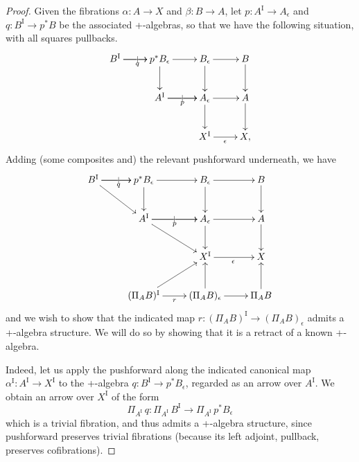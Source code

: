 \documentclass[11pt]{article}
\makeatletter
\newcommand{\pbcorner}[1][dr]{\save*!/#1-1.2pc/#1:(-1,1)@^{|-}\restore}
\newcommand{\ra}{\ensuremath{\rightarrow}}
\newcommand{\I}{\ensuremath{\mathrm{I}}}
\theoremstyle{remark}
\theoremstyle{definition}
\makeatother
\begin{document}
\begin{proof}
Given the fibrations $\alpha : A \ra X$ and $\beta: B\ra A$, let $p : A^\I \ra A_\epsilon$ and $q : B^\I \ra p^*B$ be the associated +-algebras, so that we have the following situation, with all squares pullbacks.
\begin{equation}\label{diagram:frobenius1}
\xymatrix{
B^\I \ar[r]|| \ar[r]_{q}   & p^*B_\epsilon \ar[r]  \ar[d]  & B_{\epsilon}  \ar[d]   \ar[r] & B \ar[d]\\
&A^\I \ar[r]|| \ar[r]_{p}  & A_{\epsilon} \ar[d]   \ar[r] & A \ar[d]\\
&& X^\I \ar[r]_{\epsilon} &  X,
}
\end{equation}
Adding (some composites and) the relevant pushforward underneath, we have
 \begin{equation}\label{diagram:frobenius2}
\xymatrix{
B^\I \ar[r]|| \ar[r]_{q} \ar[rd]  & p^*B_\epsilon \ar[r]  \ar[d]  & B_{\epsilon}  \ar[d]   \ar[r] & B \ar[d] \\
& A^\I \ar[r]|| \ar[r]_{p} \ar[rd]  & A_{\epsilon} \ar[d]   \ar[r] & A \ar[d] \\
&& X^\I \ar[r]_{\epsilon} &  X \\
& (\Pi_AB)^\I  \ar[r]_r  \ar[ru] & (\Pi_AB)_\epsilon  \ar[u] \ar[r] & \Pi_AB \ar[u]
}
\end{equation}
and we wish to show that the indicated map $r : (\Pi_AB)^\I \to (\Pi_AB)_\epsilon$
 admits a +-algebra structure. We will do so by showing that it is a retract of a known +-algebra.

Indeed, let us apply the pushforward along the indicated canonical map $\alpha^\I:A^\I \ra X^\I$ to the +-algebra $q : B^\I \ra p^*B_\epsilon$, regarded as an arrow over $A^\I$.  We obtain an arrow over $X^\I$ of the form
\[
\Pi_{A^\I}\,q :  \Pi_{A^\I}\,B^\I \to \Pi_{A^\I}\,p^*B_\epsilon
\]
which is a trivial fibration, and thus admits a +-algebra structure, since pushforward preserves trivial fibrations (because its left adjoint, pullback, preserves cofibrations).


\end{proof}
\end{document}
